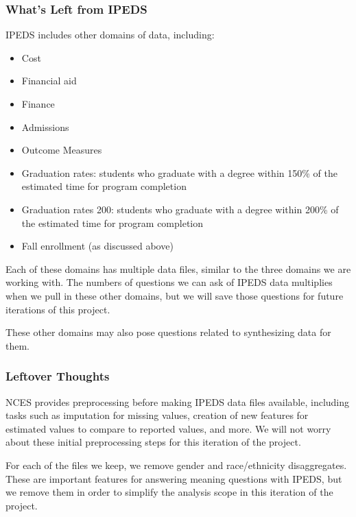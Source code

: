 \documentclass[sigconf, authorversion, nonacm]{acmart}
\begin{document}
        \subsubsection{What's Left from IPEDS}

            IPEDS includes other domains of data, including:

            \begin{itemize}
                \item Cost
                \item Financial aid
                \item Finance
                \item Admissions
                \item Outcome Measures
                \item Graduation rates: students who graduate with a degree within 150\% of the estimated time for program completion
                \item Graduation rates 200: students who graduate with a degree within 200\% of the estimated time for program completion
                \item Fall enrollment (as discussed above)
            \end{itemize}

            Each of these domains has multiple data files, similar to the three domains we are working with. The numbers of questions we can ask of IPEDS data multiplies when we pull in these other domains, but we will save those questions for future iterations of this project.

            These other domains may also pose questions related to synthesizing data for them.

        \subsubsection{Leftover Thoughts}

            NCES provides preprocessing before making IPEDS data files available, including tasks such as imputation for missing values, creation of new features for estimated values to compare to reported values, and more. We will not worry about these initial preprocessing steps for this iteration of the project.

            For each of the files we keep, we remove gender and race/ethnicity disaggregates. These are important features for answering meaning questions with IPEDS, but we remove them in order to simplify the analysis scope in this iteration of the project.
\end{document}
